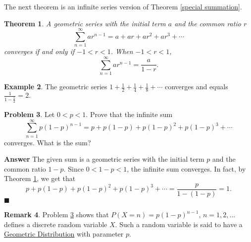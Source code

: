 \documentclass[12pt,letterpaper]{book}
\numberwithin{equation}{section}
\newtheorem{thm}{\textbf{Theorem}}[section]
\theoremstyle{definition}
\newtheorem{problem}[thm]{\textbf{Problem}}
\newtheorem{example}[thm]{\textbf{Example}}
\newtheorem{remark}[thm]{\textbf{Remark}}
\newenvironment{answer}{\noindent\textbf{Answer}}{\hfill$\blacksquare$\vspace{0.1in}}
\begin{document}
The next theorem is an infinite series version of Theorem \ref{special summation}.

\begin{thm}\label{geometric series}
A geometric series with the initial term $a$ and the common ratio $r$ $$\sum_{n=1}^\infty ar^{n-1}=a+ar+ar^2+ar^3+\cdots$$
converges if and only if $-1<r<1$. When $-1<r<1$,
$$\sum_{n=1}^\infty ar^{n-1}=\frac{a}{1-r}.$$
\end{thm}

\begin{example} The geometric series $1+\frac{1}{2}+\frac{1}{4}+\frac{1}{8}+\cdots$ converges and equals $\frac{1}{1-\frac{1}{2}}=2.$
\end{example}

\begin{problem}\label{geo dist}
Let $0<p<1$. Prove that the infinite sum
$$\sum_{n=1}^\infty p(1-p)^{n-1}=p+p(1-p)+p(1-p)^2+p(1-p)^3+\cdots$$
converges. What is the sum?
\end{problem}

\begin{answer}
The given sum is a geometric series with the initial term $p$ and the common ratio $1-p$. Since $0<1-p<1$, the infinite sum converges. In fact, by Theorem \ref{geometric series}, we get that
$$p+p(1-p)+p(1-p)^2+p(1-p)^3+\cdots=\frac{p}{1-(1-p)}=1.$$
\end{answer}

\begin{remark}
Problem \ref{geo dist} shows that $P(X=n)=p(1-p)^{n-1}$, $n=1,2,\ldots$ defines a discrete random variable $X$. Such a random variable is said to have a \underline{Geometric Distribution} with parameter $p$.
\end{remark}
\end{document}
